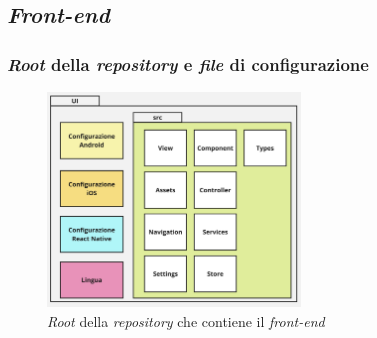 \subsection{\textit{Front-end}}
\subsubsection{\textit{Root} della \textit{repository} e \textit{file} di configurazione}

\begin{figure}[H]
      \centering
      \includegraphics[width=0.6\textwidth]{img/architettura_ui.jpg}
      \caption{\textit{Root} della \textit{repository} che contiene il \textit{front-end}}
      \label{fig:ui architecture}
\end{figure}

